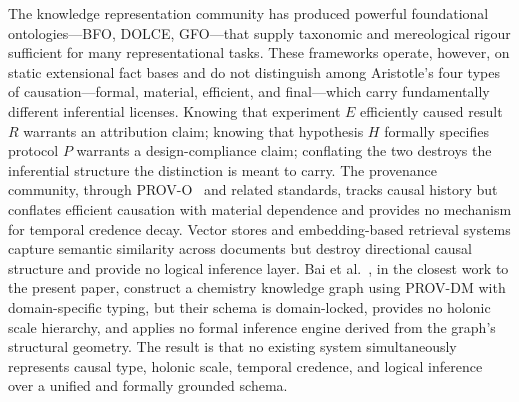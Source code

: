 \documentclass{iosart2x}
\begin{document}
The knowledge representation community has produced powerful foundational ontologies---BFO, DOLCE, GFO---that supply taxonomic and mereological rigour sufficient for many representational tasks. These frameworks operate, however, on static extensional fact bases and do not distinguish among Aristotle's four types of causation---formal, material, efficient, and final---which carry fundamentally different inferential licenses. Knowing that experiment $E$ efficiently caused result $R$ warrants an attribution claim; knowing that hypothesis $H$ formally specifies protocol $P$ warrants a design-compliance claim; conflating the two destroys the inferential structure the distinction is meant to carry. The provenance community, through PROV-O~\cite{moreau2013prov} and related standards, tracks causal history but conflates efficient causation with material dependence and provides no mechanism for temporal credence decay. Vector stores and embedding-based retrieval systems capture semantic similarity across documents but destroy directional causal structure and provide no logical inference layer. Bai et al.~\cite{bai2024dynamic}, in the closest work to the present paper, construct a chemistry knowledge graph using PROV-DM with domain-specific typing, but their schema is domain-locked, provides no holonic scale hierarchy, and applies no formal inference engine derived from the graph's structural geometry. The result is that no existing system simultaneously represents causal type, holonic scale, temporal credence, and logical inference over a unified and formally grounded schema.
\end{document}
